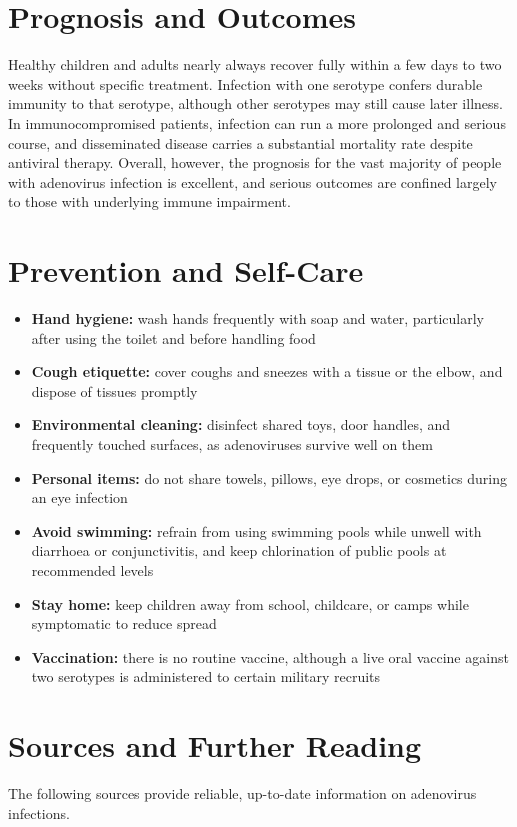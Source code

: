 \section*{Prognosis and Outcomes}
Healthy children and adults nearly always recover fully within a few days to two weeks without specific treatment. Infection with one serotype confers durable immunity to that serotype, although other serotypes may still cause later illness. In immunocompromised patients, infection can run a more prolonged and serious course, and disseminated disease carries a substantial mortality rate despite antiviral therapy. Overall, however, the prognosis for the vast majority of people with adenovirus infection is excellent, and serious outcomes are confined largely to those with underlying immune impairment.

\section*{Prevention and Self-Care}
\begin{itemize}
    \item \textbf{Hand hygiene:} wash hands frequently with soap and water, particularly after using the toilet and before handling food
    \item \textbf{Cough etiquette:} cover coughs and sneezes with a tissue or the elbow, and dispose of tissues promptly
    \item \textbf{Environmental cleaning:} disinfect shared toys, door handles, and frequently touched surfaces, as adenoviruses survive well on them
    \item \textbf{Personal items:} do not share towels, pillows, eye drops, or cosmetics during an eye infection
    \item \textbf{Avoid swimming:} refrain from using swimming pools while unwell with diarrhoea or conjunctivitis, and keep chlorination of public pools at recommended levels
    \item \textbf{Stay home:} keep children away from school, childcare, or camps while symptomatic to reduce spread
    \item \textbf{Vaccination:} there is no routine vaccine, although a live oral vaccine against two serotypes is administered to certain military recruits
\end{itemize}

\section*{Sources and Further Reading}
The following sources provide reliable, up-to-date information on adenovirus infections.

